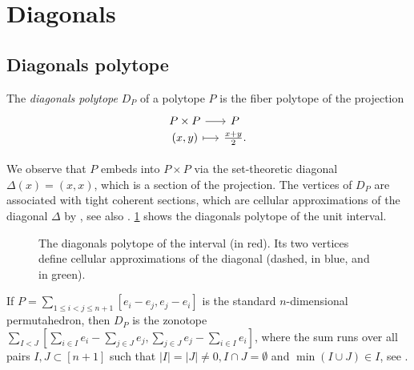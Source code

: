 
\section{Diagonals} \label{s:diagonals}


\subsection{Diagonals polytope}

\begin{definition}
	The \emph{diagonals polytope} $D_P$ of a polytope $P$ is the fiber polytope of the projection
	\[
	\begin{tikzcd}[row sep=-2,column sep=small]
		P \times P \arrow[r] & P \\
		(x,y) \arrow[r,mapsto] &\textstyle\frac{x+y}{2}.
	\end{tikzcd}
	\]
\end{definition}

We observe that $P$ embeds into $P\times P$ via the set-theoretic diagonal $\Delta (x)=(x,x)$, which is a section of the projection.
The vertices of $D_P$ are associated with tight coherent sections, which are cellular approximations of the diagonal $\Delta$ by \cite[Proposition 5]{MTTV19}, see also \cite[Proposition 1.1]{GLA21}.
\cref{f:diagonal-interval} shows the diagonals polytope of the unit interval. 

\begin{figure}[h!]
	\centering
	
	\caption{The diagonals polytope of the interval (in red). Its two vertices define cellular approximations of the diagonal (dashed, in blue, and in green).}
	\label{f:diagonal-interval}
\end{figure}


\begin{example} 
\label{e:permutahedron}
	If $P=\sum_{1 \leq i<j \leq n+1} [e_i-e_j, e_j-e_i]$ is the standard $n$-dimensional permutahedron, then $D_P$ is the zonotope $\sum_{I<J} [\sum_{i \in I}e_i - \sum_{j \in J}e_j, \sum_{j \in J} e_j - \sum_{i \in I}e_i]$, where the sum runs over all pairs $I,J\subset [n+1]$ such that $|I|=|J|\neq 0, I\cap J = \emptyset$ and $\min(I \cup J) \in I$, see \cite[Theorem 3.6]{GLA21}.
\end{example}

